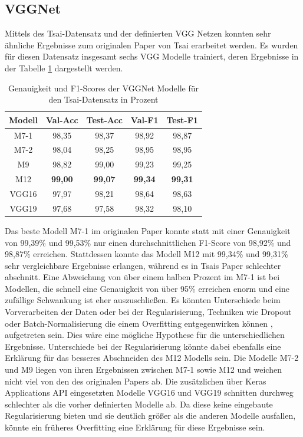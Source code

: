 \documentclass[twoside,a4paper]{IEEEtran}
\begin{document}
\subsection{VGGNet}

Mittels des Tsai-Datensatz und der definierten VGG Netzen konnten sehr ähnliche Ergebnisse zum originalen Paper von Tsai erarbeitet werden. Es wurden für diesen Datensatz insgesamt sechs VGG Modelle trainiert, deren Ergebnisse in der Tabelle \ref{vgg_ergebnis_tsai} dargestellt werden.

\begin{table}[!htb]
	\caption{Genauigkeit und F1-Scores der VGGNet Modelle für den Tsai-Datensatz in Prozent}
	\label{vgg_ergebnis_tsai}
	\centering
	\begin{tabular}{|c|c|c|c|c|}
		\hline
		Modell & Val-Acc & Test-Acc & Val-F1 & Test-F1\\
		\hline
		\hline
		M7-1 & 98,35 & 98,37 & 98,92 & 98,87\\
		\hline
		M7-2 & 98,04 & 98,25 & 98,95 & 98,95\\
		\hline
		M9 & 98,82 & 99,00 & 99,23 & 99,25\\
		\hline 
		M12 & \textbf{99,00} & \textbf{99,07} & \textbf{99,34} & \textbf{99,31}\\
		\hline 
		VGG16 & 97,97 & 98,21 & 98,64 & 98,63\\
		\hline 
		VGG19 & 97,68 & 97,58 & 98,32 & 98,10\\
		\hline 
	\end{tabular}
\end{table}

Das beste Modell M7-1 im originalen Paper konnte statt mit einer Genauigkeit von 99,39\% und 99,53\% nur einen durchschnittlichen F1-Score von 98,92\% und 98,87\% erreichen. Stattdessen konnte das Modell M12 mit 99,34\% und 99,31\% sehr vergleichbare Ergebnisse erlangen, während es in Tsais Paper schlechter abschnitt. Eine Abweichung von über einem halben Prozent im M7-1 ist bei Modellen, die schnell eine Genauigkeit von über 95\% erreichen enorm und eine zufällige Schwankung ist eher auszuschließen. Es könnten Unterschiede beim Vorverarbeiten der Daten oder bei der Regularisierung, Techniken wie Dropout oder Batch-Normalisierung die einem Overfitting entgegenwirken können \cite[S.27]{MACHINE_LEARNING}, aufgetreten sein. Dies wäre eine mögliche Hypothese für die unterschiedlichen Ergebnisse. Unterschiede bei der Regularisierung könnte dabei ebenfalls eine Erklärung für das besseres Abschneiden des M12 Modells sein. Die Modelle M7-2 und M9 liegen von ihren Ergebnissen zwischen M7-1 sowie M12 und weichen nicht viel von den des originalen Papers ab. Die zusätzlichen über Keras Applications API eingesetzten Modelle VGG16 und VGG19 schnitten durchweg schlechter als die vorher definierten Modelle ab. Da diese keine eingebaute Regularisierung bieten \cite{keras_vgg} und sie deutlich größer als die anderen Modelle ausfallen, könnte ein früheres Overfitting eine Erklärung für diese Ergebnisse sein.
\end{document}
